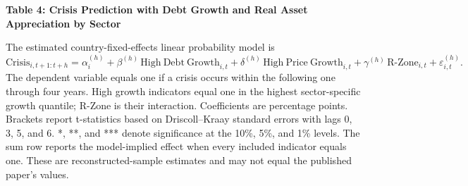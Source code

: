 \documentclass[10pt]{article}
\begin{document}
\noindent\textbf{Table 4: Crisis Prediction with Debt Growth and Real Asset Appreciation by Sector}

\smallskip
\noindent\scriptsize
The estimated country-fixed-effects linear probability model is
\[
 \mathrm{Crisis}_{i,t+1:t+h}
 = \alpha_i^{(h)} + \beta^{(h)}\,\mathrm{High\ Debt\ Growth}_{i,t}
 + \delta^{(h)}\,\mathrm{High\ Price\ Growth}_{i,t}
 + \gamma^{(h)}\,\mathrm{R\mbox{-}Zone}_{i,t} + \varepsilon_{i,t}^{(h)}.
\]
The dependent variable equals one if a crisis occurs within the following
one through four years. High growth indicators equal one in the highest
sector-specific growth quantile; R-Zone is their interaction. Coefficients are
percentage points. Brackets report t-statistics based on Driscoll--Kraay standard
errors with lags 0, 3, 5, and 6. *, **, and *** denote significance at the 10\%,
5\%, and 1\% levels. The sum row reports the model-implied effect when every
included indicator equals one. These are reconstructed-sample estimates and may 
not equal the published paper's values.

\normalsize
\medskip

\end{document}
